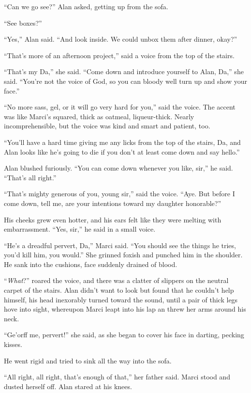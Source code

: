 ``Can we go see?'' Alan asked, getting up from the sofa.

``See boxes?''

``Yes,'' Alan said.  ``And look inside.  We could unbox them after
dinner, okay?''

``That's more of an afternoon project,'' said a voice from the top of
the stairs.

``That's my Da,'' she said.  ``Come down and introduce yourself to
Alan, Da,'' she said.  ``You're not the voice of God, so you can
bloody well turn up and show your face.''

``No more sass, gel, or it will go very hard for you,'' said the
voice.  The accent was like Marci's squared, thick as oatmeal,
liqueur-thick.  Nearly incomprehensible, but the voice was kind and
smart and patient, too.

``You'll have a hard time giving me any licks from the top of the
stairs, Da, and Alan looks like he's going to die if you don't at
least come down and say hello.''

Alan blushed furiously.  ``You can come down whenever you like, sir,''
he said.  ``That's all right.''

``That's mighty generous of you, young sir,'' said the voice.  ``Aye. 
But before I come down, tell me, are your intentions toward my
daughter honorable?''

His cheeks grew even hotter, and his ears felt like they were melting
with embarrassment.  ``Yes, sir,'' he said in a small voice.

``He's a dreadful pervert, Da,'' Marci said.  ``You should see the
things he tries, you'd kill him, you would.'' She grinned foxish and
punched him in the shoulder.  He sank into the cushions, face suddenly
drained of blood.

``\textit{What}?'' roared the voice, and there was a clatter of
slippers on the neutral carpet of the stairs.  Alan didn't want to
look but found that he couldn't help himself, his head inexorably
turned toward the sound, until a pair of thick legs hove into sight,
whereupon Marci leapt into his lap an threw her arms around his neck.

``Ge'orff me, pervert!'' she said, as she began to cover his face in
darting, pecking kisses.

He went rigid and tried to sink all the way into the sofa.

``All right, all right, that's enough of that,'' her father said. 
Marci stood and dusted herself off.  Alan stared at his knees.

